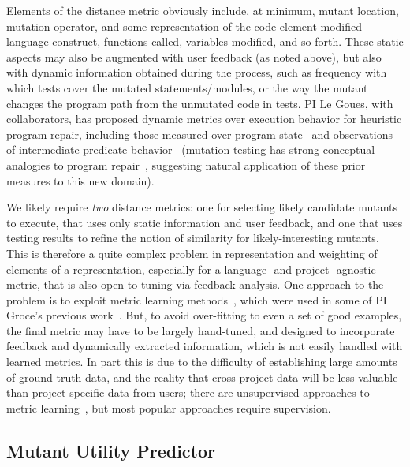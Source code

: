 Elements of the
distance metric obviously include, at minimum, mutant location, mutation operator, and
some representation of the code element modified --- language
construct, functions called, variables modified, and so forth.  These
static aspects may also be augmented with user feedback (as noted
above), but also with dynamic information obtained during the process,
such as frequency with which tests cover the mutated
statements/modules, or the way the mutant changes the
program path from the unmutated code in tests.  PI Le Goues, with collaborators,
has proposed dynamic metrics over execution behavior for heuristic program repair,
including those measured over program state~\cite{desouza-gecco18,oliveira-ese18} and
observations of intermediate predicate behavior~\cite{Ding2019} (mutation testing
has strong conceptual analogies to program repair~\cite{Weimer2013}, suggesting
natural application of these prior measures to this new domain).

We likely require
\emph{two} distance metrics:  one for selecting likely candidate
mutants to execute, that uses only static information and user
feedback, and one that uses testing results to refine the notion of
similarity for likely-interesting mutants.
This is therefore a quite complex problem in representation and weighting of elements of a
representation, especially for a language- and
project- agnostic metric, that is also open to tuning via feedback
analysis.  One approach to the problem is to exploit metric learning
methods~\cite{kulis2012metric}, which were used in some of PI Groce's
previous work~\cite{SoftMining}.  But, to avoid over-fitting
to even a set of good examples, the final metric may have to be largely
hand-tuned, and designed to incorporate feedback and dynamically
extracted information, which is not easily handled with learned metrics.  In part this is due to the difficulty of establishing
large amounts of ground truth data, and the reality that
cross-project data will be less valuable than project-specific data
from users; there are unsupervised
approaches to metric
learning~\cite{scholkopf1998nonlinear,tipping1999probabilistic}, but most
popular approaches require supervision.

\subsection{Mutant Utility Predictor}

